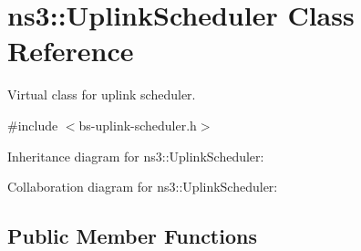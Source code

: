 \hypertarget{classns3_1_1UplinkScheduler}{}\section{ns3\+:\+:Uplink\+Scheduler Class Reference}
\label{classns3_1_1UplinkScheduler}


Virtual class for uplink scheduler.  




{\ttfamily \#include $<$bs-\/uplink-\/scheduler.\+h$>$}



Inheritance diagram for ns3\+:\+:Uplink\+Scheduler\+:


Collaboration diagram for ns3\+:\+:Uplink\+Scheduler\+:
\subsection*{Public Member Functions}
